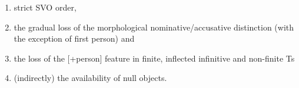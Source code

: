 \documentclass[output=paper]{langsci/langscibook}
\begin{document}
\begin{enumerate}
\item strict SVO order, 
\item the gradual loss of the morphological nominative\slash accusative distinction (with the exception of first person) and 
\item the loss of the [+person] feature in finite, inflected infinitive and non-finite Ts
\item (indirectly) the availability of null objects. 
\end{enumerate}

% 
% 
% 
% 
% 
% 
% 
% 
% 
% 
% 
% 
\end{document}
